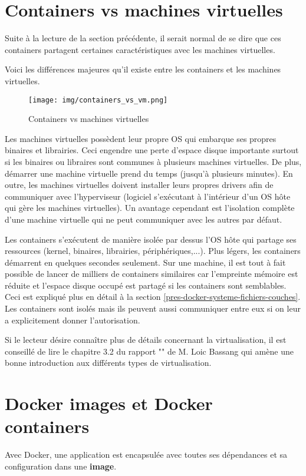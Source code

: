 \section{Containers vs machines virtuelles}
Suite à la lecture de la section précédente, il serait normal de se dire que ces containers partagent certaines caractéristiques avec les machines virtuelles.

Voici les différences majeures qu'il existe entre les containers et les machines virtuelles\cite{what_is_docker}.

\begin{figure}[hbtp]
\centering
\texttt{[image: img/containers\_vs\_vm.png]}
\caption{Containers vs machines virtuelles}
\end{figure}

Les machines virtuelles possèdent leur propre OS qui embarque ses propres binaires et librairies. Ceci engendre une perte d'espace disque importante surtout si les binaires ou libraires sont communes à plusieurs machines virtuelles. De plus, démarrer une machine virtuelle prend du temps (jusqu'à plusieurs minutes). En outre, les machines virtuelles doivent installer leurs propres drivers afin de communiquer avec l'hyperviseur (logiciel s'exécutant à l'intérieur d'un OS hôte qui gère les machines virtuelles). Un avantage cependant est l'isolation complète d'une machine virtuelle qui ne peut communiquer avec les autres par défaut.

Les containers s'exécutent de manière isolée par dessus l'OS hôte qui partage ses ressources (kernel, binaires, librairies, périphériques,...). Plus légers, les containers démarrent en quelques secondes seulement. Sur une machine, il est tout à fait possible de lancer de milliers de containers similaires car l'empreinte mémoire est réduite et l'espace disque occupé est partagé si les containers sont semblables. Ceci est expliqué plus en détail à la section \ref{pres-docker-systeme-fichiers-couches}. Les containers sont isolés mais ils peuvent aussi communiquer entre eux si on leur a explicitement donner l'autorisation.

Si le lecteur désire connaître plus de détails concernant la virtualisation, il est conseillé de lire le chapitre 3.2 du rapport "\bassangPrjSemestre" de M. Loic Bassang \cite{TODO} qui amène une bonne introduction aux différents types de virtualisation.


\section{Docker images et Docker containers}
Avec Docker, une application est encapsulée avec toutes ses dépendances et sa configuration dans une \textbf{image}. 

